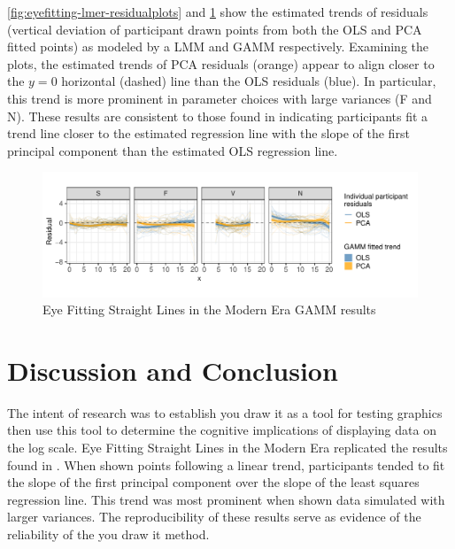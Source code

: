 \documentclass[12pt]{article}
\begin{document}
\cref{fig:eyefitting-lmer-residualplots} and
\cref{fig:eyefitting-gamm-residualplots} show the estimated trends of
residuals (vertical deviation of participant drawn points from both the
OLS and PCA fitted points) as modeled by a LMM and GAMM respectively.
Examining the plots, the estimated trends of PCA residuals (orange)
appear to align closer to the \(y=0\) horizontal (dashed) line than the
OLS residuals (blue). In particular, this trend is more prominent in
parameter choices with large variances (F and N). These results are
consistent to those found in \citet{mosteller1981eye} indicating
participants fit a trend line closer to the estimated regression line
with the slope of the first principal component than the estimated OLS
regression line.

\begin{figure}[tbp]

{\centering \includegraphics[width=1\linewidth,]{Eye-Fitting-Straight-Lines-in-the-Modern-Era_files/figure-latex/eyefitting-gamm-residualplots-1} 

}

\caption{Eye Fitting Straight Lines in the Modern Era GAMM results}\label{fig:eyefitting-gamm-residualplots}
\end{figure}

\hypertarget{discussion-and-conclusion}{%
\section{Discussion and Conclusion}\label{discussion-and-conclusion}}

The intent of research was to establish you draw it as a tool for
testing graphics then use this tool to determine the cognitive
implications of displaying data on the log scale. Eye Fitting Straight
Lines in the Modern Era replicated the results found in
\citet{mosteller1981eye}. When shown points following a linear trend,
participants tended to fit the slope of the first principal component
over the slope of the least squares regression line. This trend was most
prominent when shown data simulated with larger variances. The
reproducibility of these results serve as evidence of the reliability of
the you draw it method.
\end{document}
